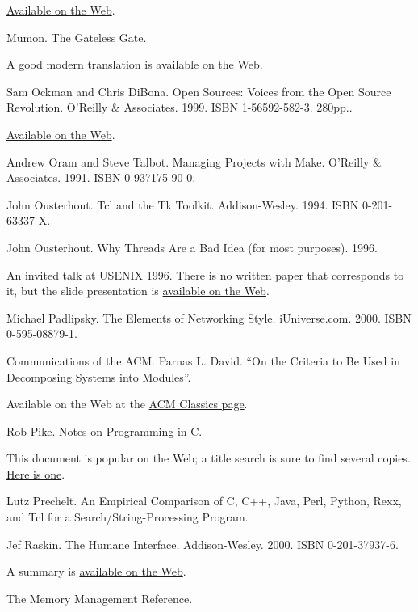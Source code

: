 \documentclass[12pt,oneside]{ctexbook}
\begin{document}
\begin{common-format}
\begin{thebibliography}{9}
\href{http://www.well.com/user/smalin/miller.html}{Available on the Web}.

 Mumon. The Gateless Gate.

\href{http://www.ibiblio.org/zen/cgi-bin/koan-index.pl}{A good modern translation is available on the Web}.

 Sam Ockman and Chris DiBona. Open Sources: Voices from the Open Source Revolution. O'Reilly \&{} Associates. 1999. ISBN 1-56592-582-3. 280pp..

\href{http://www.oreilly.com/catalog/opensources/book/toc.html}{Available on the Web}.

 Andrew Oram and Steve Talbot. Managing Projects with Make. O'Reilly \&{} Associates. 1991. ISBN 0-937175-90-0.

 John Ousterhout. Tcl and the Tk Toolkit. Addison-Wesley. 1994. ISBN 0-201-63337-X.

 John Ousterhout. Why Threads Are a Bad Idea (for most purposes). 1996.

An invited talk at USENIX 1996. There is no written paper that corresponds to it, but the slide presentation is \href{http://home.pacbell.net/ouster/threads.pdf}{available on the Web}.

 Michael Padlipsky. The Elements of Networking Style. iUniverse.com. 2000. ISBN 0-595-08879-1.

 Communications of the ACM. Parnas L. David. “On the Criteria to Be Used in Decomposing Systems into Modules”.

Available on the Web at the \href{http://www.acm.org/classics/may96/}{ACM Classics page}.

 Rob Pike. Notes on Programming in C.

This document is popular on the Web; a title search is sure to find several copies. \href{http://www.lysator.liu.se/c/pikestyle.html}{Here is one}.

 Lutz Prechelt. An Empirical Comparison of C, C++, Java, Perl, Python, Rexx, and Tcl for a Search/String-Processing Program.

 Jef Raskin. The Humane Interface. Addison-Wesley. 2000. ISBN 0-201-37937-6.

A summary is \href{http://humane.sourceforge.net/humane_interface/summary_of_thi.html}{available on the Web}.

 The Memory Management Reference.


\end{thebibliography}
\end{common-format}
\end{document}
